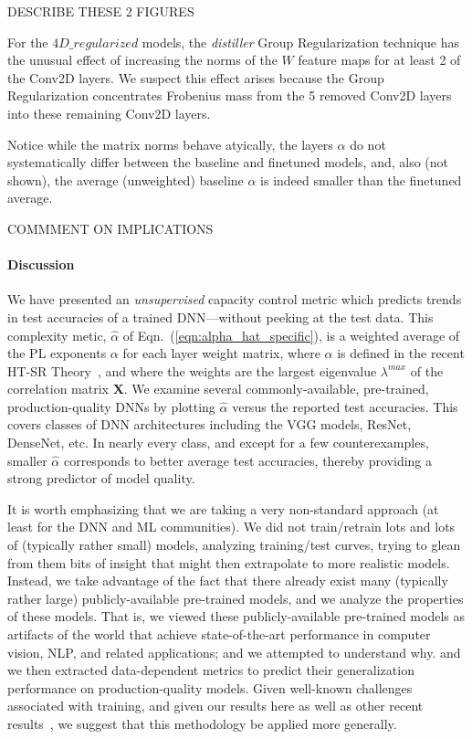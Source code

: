 DESCRIBE THESE 2 FIGURES


For the $4D\_regularized$ models, the \emph{distiller} Group Regularization technique has the unusual effect of increasing the norms of the $W$ feature maps for at least 2 of the Conv2D layers.
We suspect this effect arises because the Group Regularization  concentrates Frobenius mass from the 5 removed Conv2D layers into these remaining Conv2D layers.

Notice while the matrix norms behave atyically,  the layers $\alpha$ do not systematically differ between the baseline and finetuned models,
and, also (not shown), the average (unweighted) baseline $\alpha$ is indeed smaller than the finetuned average.

COMMMENT ON IMPLICATIONS

\paragraph{Discussion}

We have presented an \emph{unsupervised} capacity control metric which predicts trends in test accuracies of a trained DNN---without peeking at the test data. 
This complexity metic, $\hat{\alpha}$ of Eqn.~(\ref{eqn:alpha_hat_specific}), is a weighted average of the PL exponents $\alpha$ for each layer weight matrix, where $\alpha$ is defined in the recent HT-SR Theory~\cite{MM18_TR}, and where the weights are the largest eigenvalue $\lambda^{max}$ of the correlation matrix $\mathbf{X}$.  
%
We examine several commonly-available, pre-trained, production-quality DNNs by plotting $\hat{\alpha}$ versus the reported test accuracies.
This covers classes of DNN architectures including the VGG models, ResNet, DenseNet, etc. 
In nearly every class, and except for a few counterexamples, smaller $\hat{\alpha}$ corresponds to better average test accuracies, thereby providing a strong predictor of model quality.

 It is worth emphasizing that 
we are taking a very non-standard approach (at least for the DNN and ML communities).
We did not train/retrain lots and lots of (typically rather small) models, analyzing training/test curves, trying to glean from them bits of insight that might then extrapolate to more realistic models.
Instead, we take advantage of the fact that there already exist many (typically rather large) publicly-available pre-trained models, and we analyze the properties of these models.
That is, we viewed these publicly-available pre-trained models as artifacts of the world that achieve state-of-the-art performance in computer vision, NLP, and related applications; and we attempted to understand why.
and we then extracted data-dependent metrics to predict their generalization performance on production-quality models.
Given well-known challenges associated with training, and given our results here as well as other recent results~\cite{MM18_TR},
we suggest that this methodology be applied more generally.

